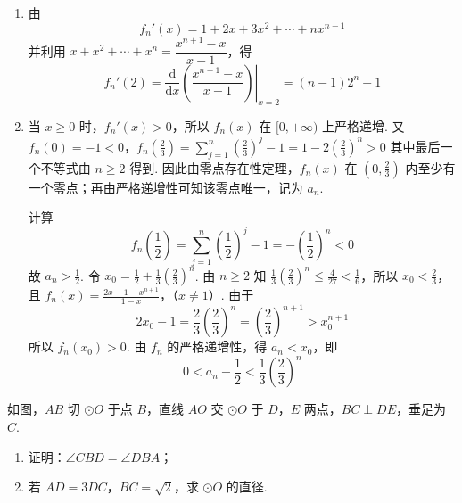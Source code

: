 \begin{solution}
\begin{enumerate}
\item
由
\[
f_n'(x)=1+2x+3x^2+\cdots+nx^{n-1}
\]
并利用 \(x+x^2+\cdots+x^n=\dfrac{x^{n+1}-x}{x-1}\)，得
\[
f_n'(2)=\left.\frac{\mathrm{d}}{\mathrm{d}x}\left(\frac{x^{n+1}-x}{x-1}\right)\right|_{x=2}=(n-1)2^n+1
\]

\item
当 \(x\geqslant0\) 时，\(f_n'(x)>0\)，所以 \(f_n(x)\) 在 \([0,+\infty)\) 上严格递增. 又
\(f_n(0)=-1<0\)，\(f_n\left(\frac{2}{3}\right)=\sum_{j=1}^{n}\left(\frac{2}{3}\right)^j-1=1-2\left(\frac{2}{3}\right)^n>0\)
其中最后一个不等式由 \(n\geqslant2\) 得到. 因此由零点存在性定理，\(f_n(x)\) 在 \(\left(0,\frac{2}{3}\right)\) 内至少有一个零点；再由严格递增性可知该零点唯一，记为 \(a_n\).

计算
\[
f_n\left(\frac{1}{2}\right)=\sum_{j=1}^{n}\left(\frac{1}{2}\right)^j-1=-\left(\frac{1}{2}\right)^n<0
\]
故 \(a_n>\frac{1}{2}\). 令 \(x_0=\frac{1}{2}+\frac{1}{3}\left(\frac{2}{3}\right)^n\). 由 \(n\geqslant2\) 知 \(\frac{1}{3}\left(\frac{2}{3}\right)^n\leqslant\frac{4}{27}<\frac{1}{6}\)，所以 \(x_0<\frac{2}{3}\)，且
\(f_n(x)=\frac{2x-1-x^{n+1}}{1-x}\)，（\(x\ne1\)）.
由于
\[
2x_0-1=\frac{2}{3}\left(\frac{2}{3}\right)^n=\left(\frac{2}{3}\right)^{n+1}>x_0^{n+1}
\]
所以 \(f_n(x_0)>0\). 由 \(f_n\) 的严格递增性，得 \(a_n<x_0\)，即
\[
0<a_n-\frac{1}{2}<\frac{1}{3}\left(\frac{2}{3}\right)^n
\]
\end{enumerate}
\end{solution}

 \begin{problem}
 如图，\(AB\) 切 \(\odot O\) 于点 \(B\)，直线 \(AO\) 交 \(\odot O\) 于 \(D\)，\(E\) 两点，\(BC \perp DE\)，垂足为 \(C\).

\begin{enumerate}
\item 证明：\(\angle CBD = \angle DBA\)；
\item 若 \(AD = 3DC\)，\(BC = \sqrt{2}\)，求 \(\odot O\) 的直径.
\end{enumerate}

 \end{problem}

